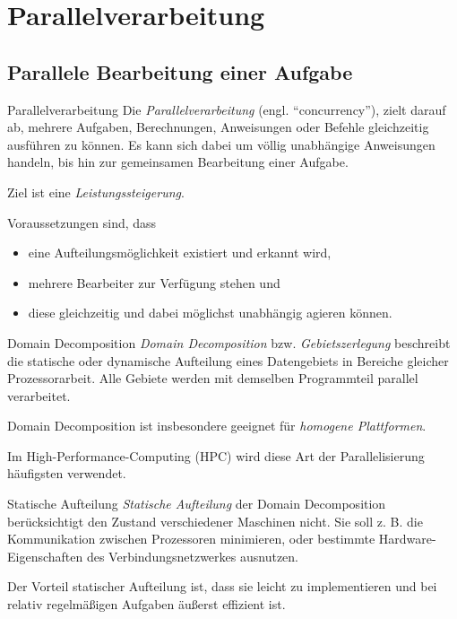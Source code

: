 \section{Parallelverarbeitung}\label{sec:parallelverarbeitung}

\subsection{Parallele Bearbeitung einer Aufgabe}

\begin{defi}{Parallelverarbeitung}
    Die \emph{Parallelverarbeitung} (engl. \enquote{concurrency}), zielt darauf ab, mehrere Aufgaben, Berechnungen, Anweisungen oder Befehle gleichzeitig ausführen zu können.
    Es kann sich dabei um völlig unabhängige Anweisungen handeln, bis hin zur gemeinsamen Bearbeitung einer Aufgabe.
    
    Ziel ist eine \emph{Leistungssteigerung}.
    
    Voraussetzungen sind, dass
    \begin{itemize}
        \item eine Aufteilungsmöglichkeit existiert und erkannt wird,
        \item mehrere Bearbeiter zur Verfügung stehen und
        \item diese gleichzeitig und dabei möglichst unabhängig agieren können.
    \end{itemize}
\end{defi}

\begin{defi}{Domain Decomposition}
    \emph{Domain Decomposition} bzw. \emph{Gebietszerlegung} beschreibt die statische oder dynamische Aufteilung eines Datengebiets in Bereiche gleicher Prozessorarbeit.
    Alle Gebiete werden mit demselben Programmteil parallel verarbeitet.
    
    Domain Decomposition ist insbesondere geeignet für \emph{homogene Plattformen}.
    
    Im High-Performance-Computing (HPC) wird diese Art der Parallelisierung häufigsten verwendet.
\end{defi}

\begin{defi}{Statische Aufteilung}
    \emph{Statische Aufteilung} der Domain Decomposition berücksichtigt den Zustand verschiedener Maschinen nicht.
    Sie soll z. B. die Kommunikation zwischen Prozessoren minimieren, oder bestimmte Hardware-Eigenschaften des Verbindungsnetzwerkes ausnutzen.
    
    Der Vorteil statischer Aufteilung ist, dass sie leicht zu implementieren und bei relativ regelmäßigen Aufgaben äußerst effizient ist.
\end{defi}

